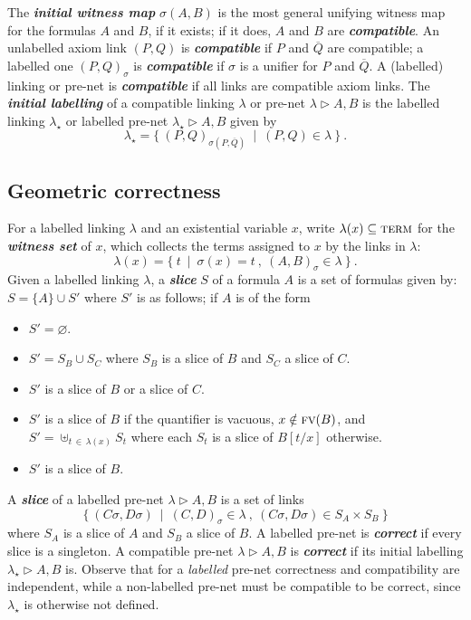 \documentclass{article}
\theoremstyle{definition}
\theoremstyle{plain}
\newcommand\defn[1]{\textit{\textbf{#1}}}
\newcommand\floor[1]{\lfloor#1\rfloor}
\newcommand\terms{\textsc{term}}
\newcommand\+{+}
\renewcommand\*{\times}
\newcommand\dual[1]{\overline{#1}}
\newcommand\fv{\textsc{fv}}
\newcommand\net[3]{#1\triangleright #2,#3}
\newcommand\clink[3][\sigma]{(#2,#3)_{#1}}
\begin{document}
The \defn{initial witness map} $\sigma(A,B)$ is the most general unifying witness map for the formulas $A$ and $B$, if it exists; if it does, $A$ and $B$ are \defn{compatible}. An unlabelled axiom link $(P,Q)$ is \defn{compatible} if $P$ and $\dual Q$ are compatible; a labelled one $\clink PQ$ is \defn{compatible} if $\sigma$ is a unifier for $P$ and $\dual Q$. A (labelled) linking or pre-net is \defn{compatible} if all links are compatible axiom links. The \defn{initial labelling} of a compatible linking $\lambda$ or pre-net $\net\lambda AB$ is the labelled linking $\lambda_\star$ or labelled pre-net $\net{\lambda_\star}AB$ given by
\[
	\lambda_\star = \{~\clink[\sigma(P,\dual Q)]PQ~\mid~(P,Q)\in\lambda~\}~.
\]
 

\subsection{Geometric correctness}

For a labelled linking $\lambda$ and an existential variable $x$, write $\lambda(x)\subseteq\terms$ for the \defn{witness set} of $x$, which collects the terms assigned to $x$ by the links in $\lambda$:
\[
	\lambda(x) = \{~t~\mid~\sigma(x) = t~,~\clink AB\in\lambda~\}~.
\]
%
Given a labelled linking $\lambda$, a \defn{slice} $S$ of a formula $A$ is a set of formulas given by: $S=\{A\}\cup S'$ where $S'$ is as follows; if $A$ is of the form
%
\begin{itemize}
	\item
{}				$S'=\varnothing$.
	\item
\makebox[40pt][l]{$B\+C$:} 			$S'=S_B\cup S_C$ where $S_B$ is a slice of $B$ and $S_C$ a slice of $C$.
	\item
\makebox[40pt][l]{$B\*C$:}			$S'$ is a slice of $B$ or a slice of $C$.
	\item
{}	$S'$ is a slice of $B$ if the quantifier is vacuous, $x\notin\fv(B)$, and
	\\[\itemsep]
	\hspace*{40pt}					$S'=\uplus_{t\,\in\,\lambda(x)}S_t$ where each $S_t$ is a slice of $B[t/x]$ otherwise.
	\item
{}	$S'$ is a slice of $B$.
\end{itemize}
%
A \defn{slice} of a labelled pre-net $\net\lambda AB$ is a set of links
\[
	\{~(C\sigma,D\sigma)~\mid~\clink CD\in \lambda~,~(C\sigma,D\sigma)\in S_A\times S_B~\}
\]
where $S_A$ is a slice of $A$ and $S_B$ a slice of $B$. A labelled pre-net is \defn{correct} if every slice is a singleton. A compatible pre-net $\net\lambda AB$ is \defn{correct} if its initial labelling $\net{\lambda_\star}AB$ is. Observe that for a \emph{labelled} pre-net correctness and compatibility are independent, while a non-labelled pre-net must be compatible to be correct, since $\lambda_\star$ is otherwise not defined.
\end{document}
